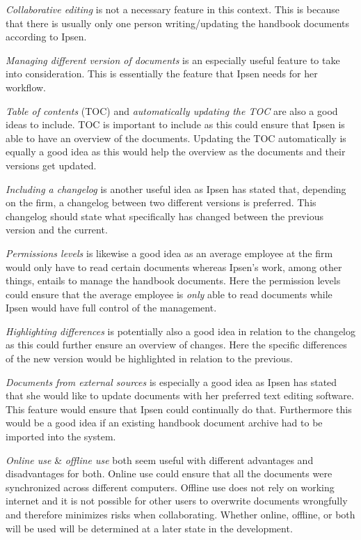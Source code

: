 \textit{Collaborative editing} is not a necessary feature in this context.
This is because that there is usually only one person writing/updating the handbook documents according to Ipsen.

\textit{Managing different version of documents} is an especially useful feature to take into consideration.
This is essentially the feature that Ipsen needs for her workflow.

\textit{Table of contents} (TOC) and \textit{automatically updating the TOC} are also a good ideas to include.
TOC is important to include as this could ensure that Ipsen is able to have an overview of the documents.
Updating the TOC automatically is equally a good idea as this would help the overview as the documents and their versions get updated.

\textit{Including a changelog} is another useful idea as Ipsen has stated that, depending on the firm, a changelog between two different versions is preferred.
This changelog should state what specifically has changed between the previous version and the current.

\textit{Permissions levels} is likewise a good idea as an average employee at the firm would only have to read certain documents whereas Ipsen's work, among other things, entails to manage the handbook documents.
Here the permission levels could ensure that the average employee is \textit{only} able to read documents while Ipsen would have full control of the management.

\textit{Highlighting differences} is potentially also a good idea in relation to the changelog as this could further ensure an overview of changes.
Here the specific differences of the new version would be highlighted in relation to the previous.

\textit{Documents from external sources} is especially a good idea as Ipsen has stated that she would like to update documents with her preferred text editing software.
This feature would ensure that Ipsen could continually do that.
Furthermore this would be a good idea if an existing handbook document archive had to be imported into the system.

\textit{Online use} \& \textit{offline use} both seem useful with different advantages and disadvantages for both.
Online use could ensure that all the documents were synchronized across different computers.
Offline use does not rely on working internet and it is not possible for other users to overwrite documents wrongfully and therefore minimizes risks when collaborating.
Whether online, offline, or both will be used will be determined at a later state in the development.

